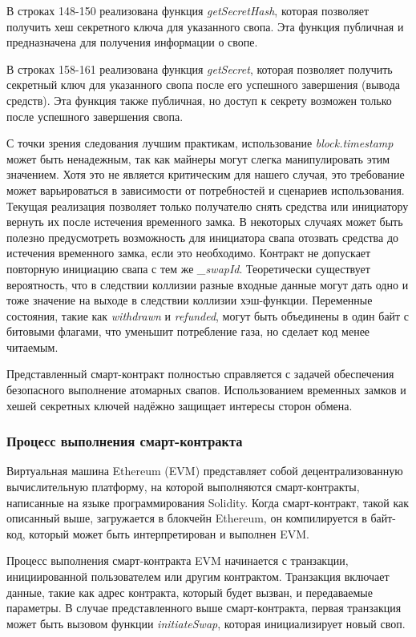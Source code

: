 В строках 148-150 реализована функция \textit{getSecretHash}, которая позволяет получить хеш секретного ключа для указанного свопа. Эта функция публичная и предназначена для получения информации о свопе.

В строках 158-161 реализована функция \textit{getSecret}, которая позволяет получить секретный ключ для указанного свопа после его успешного завершения (вывода средств). Эта функция также публичная, но доступ к секрету возможен только после успешного завершения свопа.

С точки зрения следования лучшим практикам, использование \textit{block.timestamp} может быть ненадежным, так как майнеры могут слегка манипулировать этим значением. Хотя это не является критическим для нашего случая, это требование может варьироваться в зависимости от потребностей и сценариев использования. Текущая реализация позволяет только получателю снять средства или инициатору вернуть их после истечения временного замка. В некоторых случаях может быть полезно предусмотреть возможность для инициатора свапа отозвать средства до истечения временного замка, если это необходимо. Контракт не допускает повторную инициацию свапа с тем же \textit{\_swapId}. Теоретически существует вероятность, что в следствии коллизии разные входные данные могут дать одно и тоже значение на выходе в следствии коллизии хэш-функции. Переменные состояния, такие как \textit{withdrawn} и \textit{refunded}, могут быть объединены в один байт с битовыми флагами, что уменьшит потребление газа, но сделает код менее читаемым.

Представленный смарт-контракт полностью справляется с задачей обеспечения безопасного выполнение атомарных свапов. Использованием временных замков и хешей секретных ключей надёжно защищает интересы сторон обмена.

\subsubsection{Процесс выполнения смарт-контракта}

Виртуальная машина Ethereum (EVM) представляет собой децентрализованную вычислительную платформу, на которой выполняются смарт-контракты, написанные на языке программирования Solidity. Когда смарт-контракт, такой как описанный выше, загружается в блокчейн Ethereum, он компилируется в байт-код, который может быть интерпретирован и выполнен EVM.

Процесс выполнения смарт-контракта EVM начинается с транзакции, инициированной пользователем или другим контрактом. Транзакция включает данные, такие как адрес контракта, который будет вызван, и передаваемые параметры. В случае представленного выше смарт-контракта, первая транзакция может быть вызовом функции \textit{initiateSwap}, которая инициализирует новый своп.

